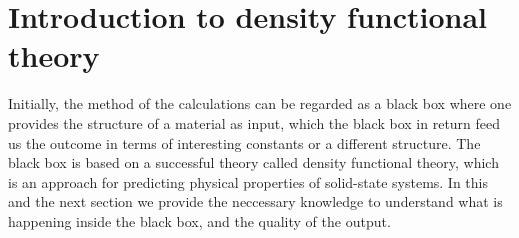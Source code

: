 \section{Introduction to density functional theory}

Initially, the method of the calculations can be regarded as a black box where one provides the structure of a material as input, which the black box in return feed us the outcome in terms of interesting constants or a different structure. The black box is based on a successful theory called density functional theory, which is an approach for predicting physical properties of solid-state systems. In this and the next section we provide the neccessary knowledge to understand what is happening inside the black box, and the quality of the output.


